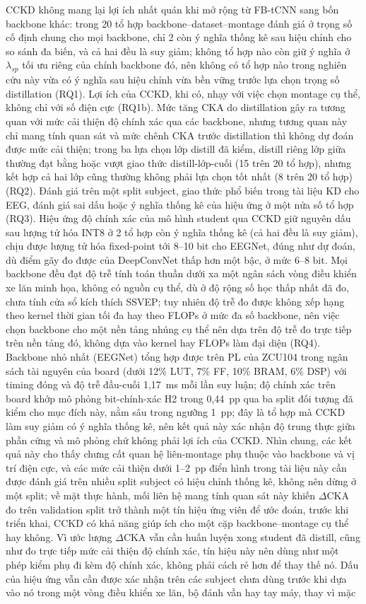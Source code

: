 \documentclass[11pt,a4paper,twoside,asymmetric]{article}
\begin{document}
CCKD không mang lại lợi ích nhất quán khi mở rộng từ FB-tCNN sang bốn backbone khác: trong 20 tổ hợp backbone--dataset--montage đánh giá ở trọng số cố định chung cho mọi backbone, chỉ 2 còn ý nghĩa thống kê sau hiệu chỉnh cho so sánh đa biến, và cả hai đều là suy giảm; không tổ hợp nào còn giữ ý nghĩa ở $\lambda_{sp}$ tối ưu riêng của chính backbone đó, nên không có tổ hợp nào trong nghiên cứu này vừa có ý nghĩa sau hiệu chỉnh vừa bền vững trước lựa chọn trọng số distillation (RQ1). Lợi ích của CCKD, khi có, nhạy với việc chọn montage cụ thể, không chỉ với số điện cực (RQ1b). Mức tăng CKA do distillation gây ra tương quan với mức cải thiện độ chính xác qua các backbone, nhưng tương quan này chỉ mang tính quan sát và mức chênh CKA trước distillation thì không dự đoán được mức cải thiện; trong ba lựa chọn lớp distill đã kiểm, distill riêng lớp giữa thường đạt bằng hoặc vượt giao thức distill-lớp-cuối \cite{R82} (15 trên 20 tổ hợp), nhưng kết hợp cả hai lớp cũng thường không phải lựa chọn tốt nhất (8 trên 20 tổ hợp) (RQ2). Đánh giá trên một split subject, giao thức phổ biến trong tài liệu KD cho EEG, đánh giá sai dấu hoặc ý nghĩa thống kê của hiệu ứng ở một nửa số tổ hợp (RQ3). Hiệu ứng độ chính xác của mô hình student qua CCKD giữ nguyên dấu sau lượng tử hóa INT8 ở 2 tổ hợp còn ý nghĩa thống kê (cả hai đều là suy giảm), chịu được lượng tử hóa fixed-point tới 8--10 bit cho EEGNet, đúng như dự đoán, dù điểm gãy đo được của DeepConvNet thấp hơn một bậc, ở mức 6--8 bit. Mọi backbone đều đạt độ trễ tính toán thuần dưới xa một ngân sách vòng điều khiển xe lăn minh họa, không có nguồn cụ thể, dù ở độ rộng số học thấp nhất đã đo, chưa tính cửa sổ kích thích SSVEP; tuy nhiên độ trễ đo được không xếp hạng theo kernel thời gian tối đa hay theo FLOPs ở mức đa số backbone, nên việc chọn backbone cho một nền tảng nhúng cụ thể nên dựa trên độ trễ đo trực tiếp trên nền tảng đó, không dựa vào kernel hay FLOPs làm đại diện (RQ4). Backbone nhỏ nhất (EEGNet) tổng hợp được trên PL của ZCU104 trong ngân sách tài nguyên của board (dưới 12\% LUT, 7\% FF, 10\% BRAM, 6\% DSP) với timing đóng và độ trễ đầu-cuối 1,17~ms mỗi lần suy luận; độ chính xác trên board khớp mô phỏng bit-chính-xác H2 trong 0,44~pp qua ba split đối tượng đã kiểm cho mục đích này, nằm sâu trong ngưỡng 1~pp; đây là tổ hợp mà CCKD làm suy giảm có ý nghĩa thống kê, nên kết quả này xác nhận độ trung thực giữa phần cứng và mô phỏng chứ không phải lợi ích của CCKD. Nhìn chung, các kết quả này cho thấy chưng cất quan hệ liên-montage phụ thuộc vào backbone và vị trí điện cực, và các mức cải thiện dưới 1--2~pp điển hình trong tài liệu này cần được đánh giá trên nhiều split subject có hiệu chỉnh thống kê, không nên dừng ở một split; về mặt thực hành, mối liên hệ mang tính quan sát này khiến $\Delta$CKA đo trên validation split trở thành một tín hiệu ứng viên để ước đoán, trước khi triển khai, CCKD có khả năng giúp ích cho một cặp backbone--montage cụ thể hay không. Vì ước lượng $\Delta$CKA vẫn cần huấn luyện xong student đã distill, cũng như đo trực tiếp mức cải thiện độ chính xác, tín hiệu này nên dùng như một phép kiểm phụ đi kèm độ chính xác, không phải cách rẻ hơn để thay thế nó. Dấu của hiệu ứng vẫn cần được xác nhận trên các subject chưa dùng trước khi dựa vào nó trong một vòng điều khiển xe lăn, bộ đánh vần hay tay máy, thay vì mặc 
\end{document}
